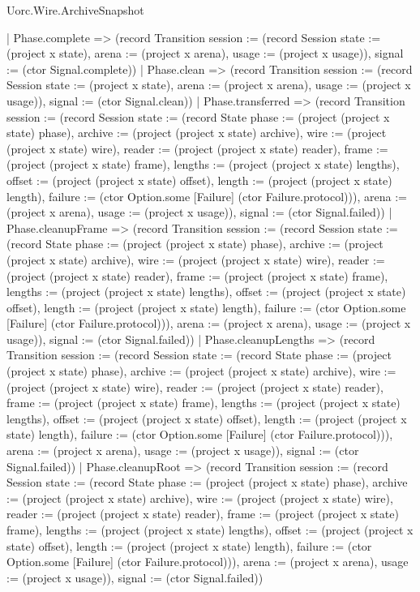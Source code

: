 \begin{lexlean}{Uorc.Wire.ArchiveSnapshot}
\begin{semanticmodule}
{      | Phase.complete => (record Transition {session := (record Session {state := (project x state), arena := (project x arena), usage := (project x usage)}), signal := (ctor Signal.complete)})
      | Phase.clean => (record Transition {session := (record Session {state := (project x state), arena := (project x arena), usage := (project x usage)}), signal := (ctor Signal.clean)})
      | Phase.transferred => (record Transition {session := (record Session {state := (record State {phase := (project (project x state) phase), archive := (project (project x state) archive), wire := (project (project x state) wire), reader := (project (project x state) reader), frame := (project (project x state) frame), lengths := (project (project x state) lengths), offset := (project (project x state) offset), length := (project (project x state) length), failure := (ctor Option.some [Failure] (ctor Failure.protocol))}), arena := (project x arena), usage := (project x usage)}), signal := (ctor Signal.failed)})
      | Phase.cleanupFrame => (record Transition {session := (record Session {state := (record State {phase := (project (project x state) phase), archive := (project (project x state) archive), wire := (project (project x state) wire), reader := (project (project x state) reader), frame := (project (project x state) frame), lengths := (project (project x state) lengths), offset := (project (project x state) offset), length := (project (project x state) length), failure := (ctor Option.some [Failure] (ctor Failure.protocol))}), arena := (project x arena), usage := (project x usage)}), signal := (ctor Signal.failed)})
      | Phase.cleanupLengths => (record Transition {session := (record Session {state := (record State {phase := (project (project x state) phase), archive := (project (project x state) archive), wire := (project (project x state) wire), reader := (project (project x state) reader), frame := (project (project x state) frame), lengths := (project (project x state) lengths), offset := (project (project x state) offset), length := (project (project x state) length), failure := (ctor Option.some [Failure] (ctor Failure.protocol))}), arena := (project x arena), usage := (project x usage)}), signal := (ctor Signal.failed)})
      | Phase.cleanupRoot => (record Transition {session := (record Session {state := (record State {phase := (project (project x state) phase), archive := (project (project x state) archive), wire := (project (project x state) wire), reader := (project (project x state) reader), frame := (project (project x state) frame), lengths := (project (project x state) lengths), offset := (project (project x state) offset), length := (project (project x state) length), failure := (ctor Option.some [Failure] (ctor Failure.protocol))}), arena := (project x arena), usage := (project x usage)}), signal := (ctor Signal.failed)})
}
\end{semanticmodule}
\end{lexlean}
